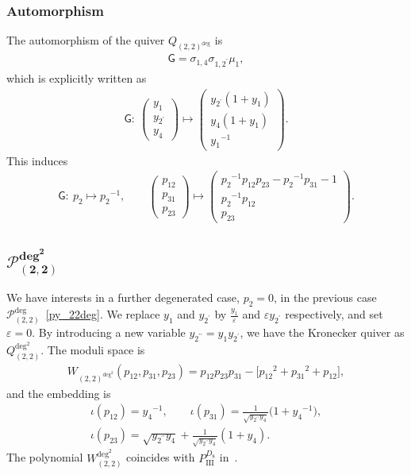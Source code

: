 \documentclass[pdftex]{sigma}
\numberwithin{equation}{section}
\begin{document}
\subsubsection*{Automorphism}
The automorphism of the quiver $Q_{(2,2)^{\text{deg}}}$ is
\begin{gather*}
 \mathsf{G} = \sigma_{1,4} \sigma_{1,2^\prime} \mu_1 ,
\end{gather*}
which is explicitly written as
\begin{gather*}
 \mathsf{G}\colon \
 \begin{pmatrix}
 y_1 \\ y_{2^\prime} \\ y_4
 \end{pmatrix}
 \mapsto
 \begin{pmatrix}
 y_{2^\prime} ( 1 + y_1) \\
 y_4 ( 1 + y_1) \\
 {y_1}^{-1}
 \end{pmatrix} .
\end{gather*}
This induces
\begin{gather*}
 \mathsf{G}\colon \
 p_2 \mapsto {p_2}^{-1} , \qquad
 \begin{pmatrix}
 p_{12} \\ p_{31} \\ p_{23}
 \end{pmatrix}
 \mapsto
 \begin{pmatrix}
 {p_2}^{-1} p_{12} p_{23} - {p_2}^{-1} p_{31} - 1 \\
 {p_2}^{-1} p_{12} \\
 p_{23}
 \end{pmatrix} .
\end{gather*}

\subsection[$\mathcal{P}_{(2,2)}^{\text{deg}^2}$]{$\boldsymbol{\mathcal{P}_{(2,2)}^{\text{deg}^2}}$}
We have interests in a further degenerated case, $p_2=0$, in the previous case $\mathcal{P}_{(2,2)}^{\text{deg}}$~\eqref{py_22deg}. We replace $y_1$ and $y_{2^\prime}$ by $\frac{y_1}{\varepsilon}$ and $\varepsilon y_{2^\prime}$ respectively, and set $\varepsilon=0$. By introducing a new variable $y_{2^{\prime\prime}}=y_1 y_{2^\prime}$, we have the Kronecker quiver as $Q_{(2,2)}^{\text{deg}^2}$. The moduli space is
\begin{gather*}
 W_{(2,2)^{\text{deg}^2}}( p_{12}, p_{31}, p_{23} ) = p_{12} p_{23} p_{31} - \big[ {p_{12}}^2 + {p_{31}}^2 +p_{12} \big] ,
\end{gather*}
and the embedding is
\begin{gather*}
 \iota(p_{12}) = {y_4}^{-1}, \qquad \iota(p_{31}) = \frac{1}{\sqrt{y_{2^{\prime\prime}} y_4}} \big( 1 + {y_4}^{-1} \big) , \\
\iota(p_{23}) = \sqrt{y_{2^{\prime\prime}} y_4} + \frac{1}{\sqrt{y_{2^{\prime\prime}} y_4}} ( 1 + y_4 ) .
\end{gather*}
The polynomial $W_{(2,2)}^{\text{deg}^2}$ coincides with $P_{\mathrm{III}}^{D_8}$ in~\cite{vdPutSaito09a}.
\end{document}
